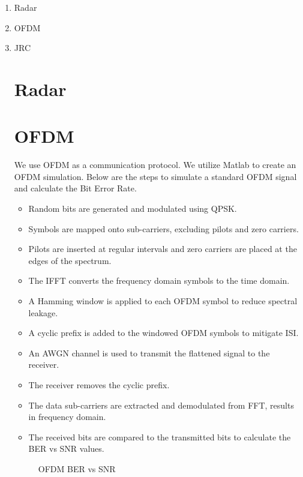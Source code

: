 \documentclass[conference]{IEEEtran}
\begin{document}
	\begin{enumerate}
		\item Radar
          \item OFDM
        \item JRC\par
        
   \section {Radar}

     \section {OFDM}
We use OFDM as a communication protocol. We utilize Matlab to create an OFDM simulation. Below are the steps to simulate a standard OFDM signal and calculate the Bit Error Rate.
\begin{itemize}
\item Random bits are generated and modulated using QPSK. 
\item Symbols are mapped onto sub-carriers, excluding pilots and zero carriers.
\item Pilots are inserted at regular intervals and zero carriers are placed at the edges of the spectrum.
\item The IFFT converts the frequency domain symbols to the time domain. 
\item A Hamming window is applied to each OFDM symbol to reduce spectral leakage. 
\item A cyclic prefix is added to the windowed OFDM symbols to mitigate ISI. 
\item An AWGN channel is used to transmit the flattened signal to the receiver.\par
\item The receiver removes the cyclic prefix. 
\item The data sub-carriers are extracted and demodulated from FFT, results in frequency domain. 
\item The received bits are compared to the transmitted bits to calculate the BER vs SNR values. 
\end{itemize}

	\begin{figure}[H]
    		\centering
    		\caption{OFDM BER vs SNR}
	\end{figure}


\end{enumerate}
\end{document}
